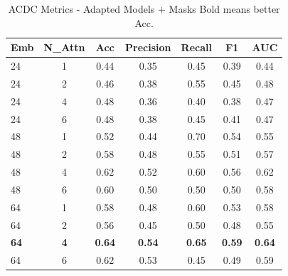 \documentclass[journal,twoside,web]{ieeecolor}
\begin{document}
\begin{table}[htbp]
\centering
\caption{ACDC Metrics - Adapted Models + Masks
\newline Bold means better Acc.}
\begin{tabular}{lcccccc}
\toprule
\textbf{Emb} & \textbf{N\_Attn} & \textbf{Acc} & \textbf{Precision} & \textbf{Recall} & \textbf{F1} & \textbf{AUC} \\
\midrule
24 & 1 & 0.44 & 0.35 & 0.45 & 0.39 & 0.44 \\
24 & 2 & 0.46 & 0.38 & 0.55 & 0.45 & 0.48 \\
24 & 4 & 0.48 & 0.36 & 0.40 & 0.38 & 0.47 \\
24 & 6 & 0.48 & 0.38 & 0.45 & 0.41 & 0.47 \\
\hline
48 & 1 & 0.52 & 0.44 & 0.70 & 0.54 & 0.55 \\
48 & 2 & 0.58 & 0.48 & 0.55 & 0.51 & 0.57 \\
48 & 4 & 0.62 & 0.52 & 0.60 & 0.56 & 0.62 \\
48 & 6 & 0.60 & 0.50 & 0.50 & 0.50 & 0.58 \\
\hline
64 & 1 & 0.58 & 0.48 & 0.60 & 0.53 & 0.58 \\
64 & 2 & 0.56 & 0.45 & 0.50 & 0.48 & 0.55 \\
\textbf{64} & \textbf{4} & \textbf{0.64} & \textbf{0.54} & \textbf{0.65} & \textbf{0.59} & \textbf{0.64} \\
64 & 6 & 0.62 & 0.53 & 0.45 & 0.49 & 0.59 \\
\bottomrule
\end{tabular}
\label{tab:metrics_acdc_orig_mask}
\end{table}
\end{document}
